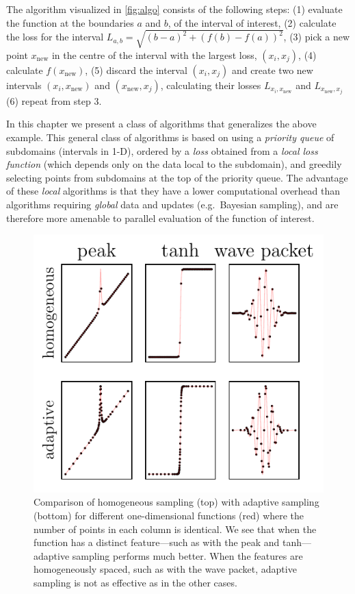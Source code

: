 
The algorithm visualized in \ref{fig:algo} consists of the following steps:
(1) evaluate the function at the boundaries $a$ and $b$, of the interval of interest,
(2) calculate the loss for the interval $L_{a, b} = \sqrt{(b - a)^2 + (f(b) - f(a))^2}$,
(3) pick a new point $x_\textrm{new}$ in the centre of the interval with the largest loss, $(x_i, x_j)$,
(4) calculate $f(x_\textrm{new})$,
(5) discard the interval $(x_i, x_j)$ and create two new intervals $(x_i, x_\textrm{new})$ and $(x_\textrm{new}, x_j)$, calculating their losses $L_{x_i, x_\textrm{new}}$ and $L_{x_\textrm{new}, x_j}$
(6) repeat from step 3.

In this chapter we present a class of algorithms that generalizes the above example.
This general class of algorithms is based on using a \emph{priority queue} of subdomains (intervals in 1-D), ordered by a \emph{loss} obtained from a \emph{local loss function} (which depends only on the data local to the subdomain), and greedily selecting points from subdomains at the top of the priority queue.
The advantage of these \emph{local} algorithms is that they have a lower computational overhead than algorithms requiring \emph{global} data and updates (e.g.~Bayesian sampling), and are therefore more amenable to parallel evaluation of the function of interest.

\begin{figure}
\centering
\includegraphics{chapter_adaptive/figures/Learner1D.pdf}
\caption{Comparison of homogeneous sampling (top) with adaptive sampling (bottom) for different one-dimensional functions (red) where the number of points in each column is identical.
We see that when the function has a distinct feature---such as with the peak and tanh---adaptive sampling performs much better.
When the features are homogeneously spaced, such as with the wave packet, adaptive sampling is not as effective as in the other cases.\label{fig:Learner1D}}
\end{figure}

